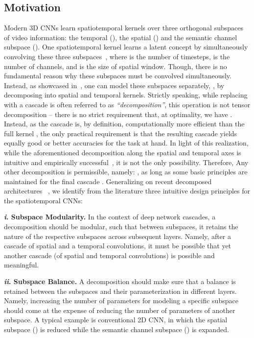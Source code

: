 \documentclass[10pt,twocolumn,letterpaper]{article}
\newcommand{\partitle}[1]{\noindent\textbf{#1}}
\begin{document}
\subsection{Motivation}
\label{subsec:motivation}
Modern 3D CNNs learn spatiotemporal kernels over three orthogonal subspaces of video information: the temporal (), the spatial () and the semantic channel subspace ().
One spatiotemporal kernel  learns a latent concept by simultaneously convolving these three subspaces~\cite{tran2015learning, carreira2017quo}, where  is the number of timesteps,  is the number of channels, and  is the size of spatial window.
Though, there is no fundamental reason why these subspaces must be convolved simultaneously.
Instead, as showcased in~\cite{xie2017rethinking}, one can model these subspaces separately, , by decomposing  into spatial  and temporal  kernels.
Strictly speaking, while replacing  with a cascade  is often referred to as \emph{``decomposition''}, this operation is not tensor decomposition -- there is no strict requirement that, at optimality, we have .
Instead, as the cascade  is, by definition, computationally more efficient than the full kernel , the only practical requirement is that the resulting cascade  yields equally good or better accuracies for the task at hand.
In light of this realization, while the aforementioned decomposition along the spatial and temporal axes is intuitive and empirically successful~\cite{xie2017rethinking}, it is not the only possibility.
Therefore, Any other decomposition is permissible, namely:
,
as long as some basic principles are maintained for the final cascade .
Generalizing on recent decomposed architectures ~\cite{tran2018closer,chollet2016xception}, we identify from the literature three intuitive design principles for the spatiotemporal CNNs:

\partitle{\textit{i}. Subspace Modularity.}
In the context of deep network cascades, a decomposition should be modular, such that between subspaces, it retains the nature of the respective subspaces across subsequent layers.
Namely, after a cascade of spatial and a temporal convolutions, it must be possible that yet another cascade (of spatial and temporal convolutions) is possible and meaningful.

\partitle{\textit{ii}. Subspace Balance.}
A decomposition should make sure that a balance is retained between the subspaces and their parameterization in different layers.
Namely, increasing the number of parameters for modeling a specific subspace should come at the expense of reducing the number of parameters of another subspace. 
A typical example is conventional 2D CNN, in which the spatial subspace () is reduced while the semantic channel subspace () is expanded.
\end{document}
